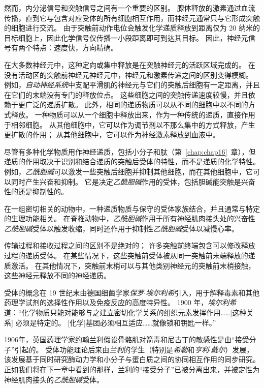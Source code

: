 然而，内分泌信号和突触信号之间有一个重要的区别。
腺体释放的激素通过血流传播，直到它与包含对应受体的所有细胞相互作用，而神经元通常只与它形成突触的细胞进行交流。
由于突触前动作电位会触发化学递质释放到距离仅为 20 纳米的目标细胞上，因此化学信号仅传播一小段距离即可到达其目标。 
因此，神经元信号有两个特点：速度快，方向精确。


在大多数神经元中，这种定向或集中释放是在突触神经元的活跃区域完成的。
在没有活动区的突触前神经元神经元中，神经元和激素传递之间的区别变得模糊。
例如，\textit{自动神经系统}中支配平滑肌的神经元与它们的突触后细胞有一定距离，并且在它们的末端没有专门的释放位点。
这些细胞之间的突触传递速度较慢，并且依赖于更广泛的递质扩散。
此外，相同的递质物质可以从不同的细胞中以不同的方式释放。
一种物质可以从一个细胞中释放出来，作为一种传统的递质，直接作用于相邻细胞。
从其他细胞中，它可以作为调节剂以不那么集中的方式释放，产生更扩散的作用；
从其他细胞中，它可以作为神经激素释放到血液中。


尽管有多种化学物质用作神经递质，包括小分子和肽（第~\ref{chap:chap16}~章），但递质的作用取决于识别和结合递质的突触后受体的特性，而不是递质的化学特性。
例如，\textit{乙酰胆碱}可以激发一些突触后细胞并抑制其他细胞，而在其他细胞中，它可以同时产生兴奋和抑制。
它是决定\textit{乙酰胆碱}作用的受体，包括胆碱能突触是兴奋性的还是抑制性的。


在一组密切相关的动物中，一种递质物质与保守的受体家族结合，并且通常与特定的生理功能相关。
在脊椎动物中，\textit{乙酰胆碱}作用于所有神经肌肉接头处的兴奋性\textit{乙酰胆碱}受体以触发收缩，同时还作用于抑制性\textit{乙酰胆碱}受体以减慢心率。


传输过程和接收过程之间的区别不是绝对的；
许多突触前终端包含可以修改释放过程的递质受体。
在某些情况下，这些突触前受体被从同一突触前末端释放的递质激活。
在其他情况下，突触前末梢可以与其他类别神经元的突触前末梢接触，这些神经元释放不同的神经递质。


受体的概念在 19 世纪末由德国细菌学家\textit{保罗$\cdot$埃尔利希}引入，用于解释毒素和其他药理学试剂的选择性作用以及免疫反应的高度特异性。
1900 年，\textit{埃尔利希}道：“化学物质只能对能够与之建立密切化学关系的组织元素发挥作用……[这种关系] 必须是特定的。
[化学]基团必须相互适应……就像锁和钥匙一样。”


1906年，英国药理学家约翰兰利假设骨骼肌对箭毒和尼古丁的敏感性是由“接受分子”引起的。
受体功能理论后来由\textit{兰利}的学生（特别是\textit{希勒}和\textit{亨利$\cdot$戴尔}）发展，该发展基于同时研究酶动力学和小分子与蛋白质之间的协同相互作用的同步研究。
正如我们将在下一章中看到的那样，兰利的“接受分子”已被分离出来，并被定性为神经肌肉接头的\textit{乙酰胆碱}受体。


